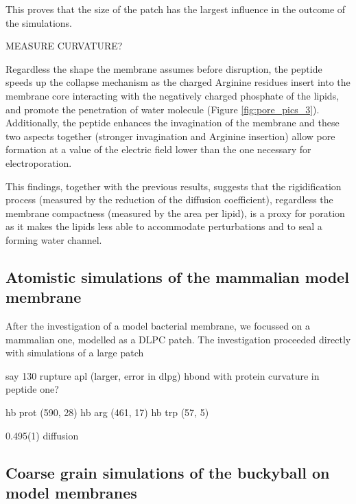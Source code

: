 This proves that the size of the patch has the largest influence in the outcome of the simulations.




MEASURE CURVATURE?

Regardless the shape the membrane assumes before disruption, the peptide speeds up the collapse mechanism as the charged Arginine residues insert into the membrane core interacting with the negatively charged phosphate of the lipids, and promote the penetration of water molecule (Figure \ref{fig:pore_pics_3}).
%
Additionally, the peptide enhances the invagination of the membrane and these two aspects together (stronger invagination and Arginine insertion) allow pore formation at a value of the electric field lower than the one necessary for electroporation.

This findings, together with the previous results, suggests that the rigidification process (measured by the reduction of the diffusion coefficient), regardless the membrane compactness (measured by the area per lipid), is a proxy for poration as it makes the lipids less able to accommodate perturbations and to seal a forming water channel.


\subsection{Atomistic simulations of the mammalian model membrane}

After the investigation of a model bacterial membrane, we focussed on a mammalian one, modelled as a DLPC patch. The investigation proceeded directly with simulations of a large patch

say
130 rupture
apl (larger, error in dlpg)
hbond with protein
curvature in peptide one?

hb prot (590, 28)
hb arg (461, 17)
hb trp (57, 5)

0.495(1) diffusion


\subsection{Coarse grain simulations of the buckyball on model membranes}
